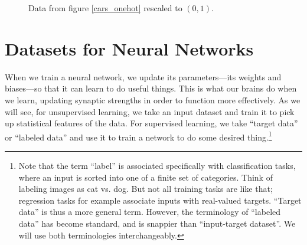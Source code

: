 \begin{figure}[h]
\centering
{}
\caption[Jeff Yoshimi, based on the Motor Trend Car Road Tests dataset included with R.]{Data from figure \ref{cars_onehot} rescaled to $(0,1)$.}
\label{cars_dataset_scaled}
\end{figure}

\section{Datasets for Neural Networks}\label{datasets}

When we train a neural network, we update its parameters---its weights and biases---so that it can learn to do useful things. This is what our brains do when we learn, updating synaptic strengths in order to function more effectively. As we will see, for unsupervised learning, we take an input dataset and train it to pick up statistical features of the data. For supervised learning, we take ``target data'' or ``labeled data'' and use it to train a network to do some desired thing.\footnote{Note that the term ``label'' is associated specifically with classification tasks, where an input is sorted into one of a finite set of categories. Think of labeling images as cat vs. dog. But not all training tasks are like that; regression tasks for example associate inputs with real-valued targets. ``Target data''  is thus a more general term. However, the terminology of ``labeled data''  has become standard, and  is snappier than ``input-target dataset''. We will use both terminologies interchangeably.}

